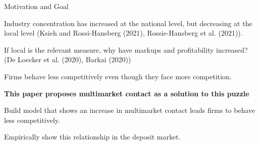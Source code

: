 \documentclass[notes,10.2pt, aspectratio=169]{beamer}
\newenvironment{wideitemize}{\itemize\addtolength{\itemsep}{10pt}}{\enditemize}
\begin{document}
    
\begin{frame}{Motivation and Goal}
\begin{wideitemize}
    \item Industry concentration has increased at the national level, but decreasing at the local level (Ksieh and Rossi-Hansberg (2021), Rossie-Hansberg et al. (2021)). 
    \item If local is the relevant measure, why have markups and profitability increased? (De Loecker et al. (2020), Barkai (2020))
    \item Firms behave less competitively even though they face more competition.
    \pause
    \item \textbf{This paper proposes multimarket contact as a solution to this puzzle} %
    \vspace{0.2cm}
    \begin{wideitemize}
      \item Build model that shows an increase in multimarket contact leads firms to behave less competitively. 
      \item Empirically show this relationship in the deposit market. 
    \end{wideitemize}

\end{wideitemize}
    
\end{frame}


    
\end{document}

